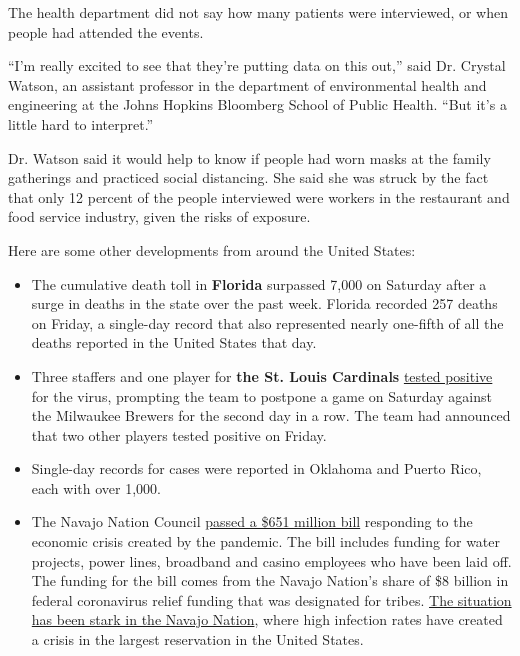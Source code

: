 The health department did not say how many patients were interviewed, or
when people had attended the events.

``I'm really excited to see that they're putting data on this out,''
said Dr. Crystal Watson, an assistant professor in the department of
environmental health and engineering at the Johns Hopkins Bloomberg
School of Public Health. ``But it's a little hard to interpret.''

Dr. Watson said it would help to know if people had worn masks at the
family gatherings and practiced social distancing. She said she was
struck by the fact that only 12 percent of the people interviewed were
workers in the restaurant and food service industry, given the risks of
exposure.

Here are some other developments from around the United States:

\begin{itemize}
\item
  The cumulative death toll in \textbf{Florida} surpassed 7,000 on
  Saturday after a surge in deaths in the state over the past week.
  Florida recorded 257 deaths on Friday, a single-day record that also
  represented nearly one-fifth of all the deaths reported in the United
  States that day.
\item
  Three staffers and one player for \textbf{the St. Louis Cardinals}
  \href{https://www.nytimes3xbfgragh.onion/2020/08/01/sports/baseball/coronavirus-cardinals.html}{tested
  positive} for the virus, prompting the team to postpone a game on
  Saturday against the Milwaukee Brewers for the second day in a row.
  The team had announced that two other players tested positive on
  Friday.
\item
  Single-day records for cases were reported in Oklahoma and Puerto
  Rico, each with over 1,000.
\item
  The Navajo Nation Council
  \href{https://apnews.com/d8322c62b4f30f5c92ad234bb1f575e0https://apnews.com/d8322c62b4f30f5c92ad234bb1f575e0}{passed
  a \$651 million bill} responding to the economic crisis created by the
  pandemic. The bill includes funding for water projects, power lines,
  broadband and casino employees who have been laid off. The funding for
  the bill comes from the Navajo Nation's share of \$8 billion in
  federal coronavirus relief funding that was designated for tribes.
  \href{https://www.nytimes3xbfgragh.onion/2020/04/09/us/coronavirus-navajo-nation.html}{The
  situation has been stark in the Navajo Nation}, where high infection
  rates have created a crisis in the largest reservation in the United
  States.
\end{itemize}


